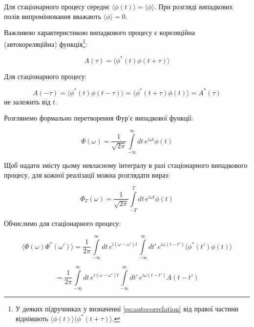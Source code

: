 Для стаціонарного процесу середнє \(\langle \phi(t) \rangle = \langle \phi \rangle\). При розгляді випадкових полів випромінювання вважають \(\langle
\phi \rangle = 0\).

Важливою характеристикою випадкового процесу є кореляційна (автокореляційна) функція\footnote{У деяких підручниках у визначенні
\eqref{eq:autocorrelation} від правої частини віднімають \(\langle \phi(t) \rangle \langle \phi^{*}(t + \tau) \rangle\).}:

\begin{equation}
A(\tau) = \langle \phi^{*}(t) \phi(t + \tau) \rangle
\label{eq:autocorrelation}
\end{equation}

Для стаціонарного процесу:

\begin{equation*}
A(-\tau) = \langle \phi^{*}(t) \phi(t - \tau) \rangle = \langle \phi^{*}(t + \tau) \phi(t) \rangle = A^{*}(\tau)
\end{equation*}
не залежить від \(t\).

Розглянемо формально перетворення Фур'є випадкової функції:

\begin{equation*}
\Phi(\omega) = \frac{1}{\sqrt{2\pi}} \int\limits_{-\infty}^{\infty} dt \, e^{i\omega t} \phi(t)
\end{equation*}

Щоб надати змісту цьому невласному інтегралу в разі стаціонарного випадкового процесу, для кожної реалізації можна розглядати вираз:

\begin{equation*}
\Phi_T(\omega) = \frac{1}{\sqrt{2\pi}} \int\limits_{-T}^{T} dt \, e^{i\omega t} \phi(t)
\end{equation*}

Обчислимо для стаціонарного процесу:

\begin{equation*}
\langle \Phi(\omega) \Phi^{*}(\omega') \rangle = \frac{1}{2\pi} \int\limits_{-\infty}^{\infty} dt \, e^{i(\omega - \omega')t}
\int\limits_{-\infty}^{\infty} dt' \,
e^{i\omega(t - t')} \langle \phi^{*}(t') \phi(t) \rangle
\end{equation*}

\begin{equation*}
= \frac{1}{2\pi} \int\limits_{-\infty}^{\infty} dt \, e^{i(\omega - \omega')t} \int\limits_{-\infty}^{\infty} dt' \, e^{i\omega(t - t')} A(t - t')
\end{equation*}

